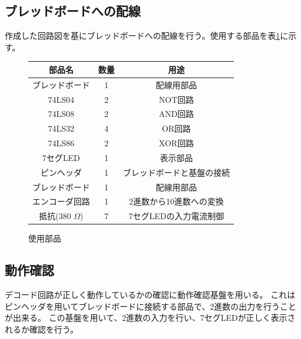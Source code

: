 \documentclass[a4paper,11pt,dvipdfmx]{jsarticle}
\begin{document}
\subsection{ブレッドボードへの配線}
作成した回路図を基にブレッドボードへの配線を行う。使用する部品を表\ref{tab:parts}に示す。
\begin{figure}[htbp]
  \centering
  \begin{tabular}{|c|c|c|}
    \hline
    部品名 & 数量 & 用途 \\
    \hline
    ブレッドボード & 1 & 配線用部品 \\
    74LS04 & 2 & NOT回路 \\
    74LS08 & 2 & AND回路 \\
    74LS32 & 4 & OR回路 \\
    74LS86 & 2 & XOR回路 \\
    7セグLED & 1 & 表示部品 \\
    ピンヘッダ & 1 & ブレッドボードと基盤の接続 \\
    ブレッドボード & 1 & 配線用部品 \\
    エンコーダ回路 & 1 & 2進数から10進数への変換 \\
    抵抗(380 $\Omega$) & 7 & 7セグLEDの入力電流制御 \\
    \hline
  \end{tabular}
  \caption{使用部品}
  \label{tab:parts}
\end{figure}
\subsection{動作確認}
デコード回路が正しく動作しているかの確認に動作確認基盤を用いる。
これはピンヘッダを用いてブレッドボードに接続する部品で、2進数の出力を行うことが出来る。
この基盤を用いて、2進数の入力を行い、7セグLEDが正しく表示されるか確認を行う。
\newpage
\end{document}
